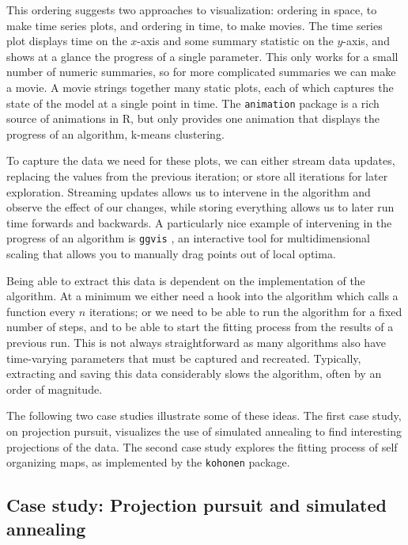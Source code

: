 \documentclass[preprint]{imsart}
\begin{document}
This ordering suggests two approaches to visualization: ordering in space, to make time series plots, and ordering in time, to make movies.  The time series plot displays time on the $x$-axis and some summary statistic on the $y$-axis, and shows at a glance the progress of a single parameter.  This only works for a small number of numeric summaries, so for more complicated summaries we can make a movie.  A movie strings together many static plots, each of which captures the state of the model at a single point in time.  The {\tt animation} package \citep{animation} is a rich source of animations in R, but only provides one animation that displays the progress of an algorithm, k-means clustering.

To capture the data we need for these plots, we can either stream data updates, replacing the values from the previous iteration; or store all iterations for later exploration.  Streaming updates allows us to intervene in the algorithm and observe the effect of our changes, while storing everything allows us to later run time forwards and backwards.  A particularly nice example of intervening in the progress of an algorithm is {\tt ggvis} \citep{buja:2008}, an interactive tool for multidimensional scaling that allows you to manually drag points out of local optima.

Being able to extract this data is dependent on the implementation of the algorithm.  At a minimum we either need a hook into the algorithm which calls a function every $n$ iterations; or we need to be able to run the algorithm for a fixed number of steps, and to be able to start the fitting process from the results of a previous run.  This is not always straightforward as many algorithms also have time-varying parameters that must be captured and recreated. Typically, extracting and saving this data  considerably slows the algorithm, often by an order of magnitude.

The following two case studies illustrate some of these ideas.  The first case study, on projection pursuit, visualizes the use of simulated annealing to find interesting projections of the data.  The second case study explores the fitting process of self organizing maps, as implemented by the {\tt kohonen} package.

\subsection{Case study: Projection pursuit and simulated annealing}
\label{sub:guided}
\end{document}
